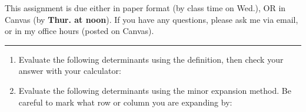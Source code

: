 \documentclass[11pt]{article}     \parskip=5pt
\begin{document}
This assignment is due either in paper format (by class time on Wed.), OR in Canvas (by \textbf{Thur. at noon}).  
If you have any questions, please ask me via email, or in my office hours (posted on Canvas).

\hrule

\begin{enumerate}
\item Evaluate the following determinants using the definition, then check your answer with your calculator: 

\begin{enumerate}
\end{enumerate}
\item Evaluate the following determinants using the minor expansion method. Be careful to mark what row or column you are expanding by: 
\begin{enumerate}
\end{enumerate}


\end{enumerate}
\end{document}
